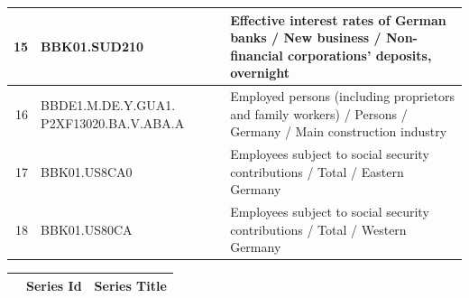 \documentclass[11pt]{article}
\begin{document}
\begin{table}[ht]
\begin{tabular}{rp{5cm}p{11cm}}
  \hline
  15 & BBK01.SUD210 & Effective interest rates of German banks / New business / Non-financial corporations' deposits, overnight \\ 
  \hline
  16 & BBDE1.M.DE.Y.GUA1. P2XF13020.BA.V.ABA.A & Employed persons (including proprietors and family workers) / Persons / Germany / Main construction industry \\ 
  \hline
  17 & BBK01.US8CA0 & Employees subject to social security contributions / Total / Eastern Germany \\ 
  \hline
  18 & BBK01.US80CA & Employees subject to social security contributions / Total / Western Germany \\ 
\end{tabular}
\end{table}

\begin{table}
\centering
\begin{tabular}{rp{5cm}p{11cm}}
  & \textbf{Series Id} & \textbf{Series Title} \\
  \hline
  \hline


\end{tabular}
\end{table}
\end{document}
